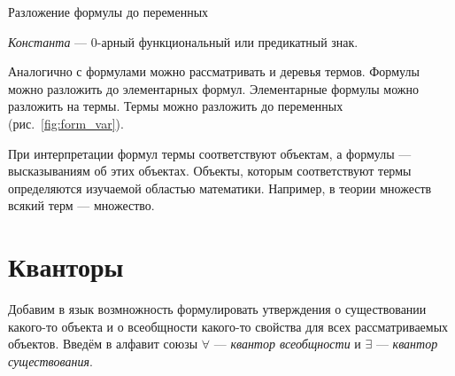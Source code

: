 \newcommand\eps{\varepsilon}
\begin{marginfigure}
  \centering

  \caption{Разложение формулы до переменных}\label{fig:form_var}
\end{marginfigure}

{\it Константа} --- $0$-арный
функциональный или предикатный знак.

Аналогично с формулами можно рассматривать и деревья термов.
Формулы можно разложить до элементарных формул. Элементарные формулы
можно разложить на термы. Термы можно разложить до переменных (рис.~\ref{fig:form_var}).

При интерпретации формул термы соответствуют объектам, а формулы --- высказываниям
об этих объектах. Объекты, которым соответствуют термы определяются изучаемой
областью математики. Например, в теории множеств всякий терм --- множество.

\section{Кванторы}

Добавим в язык возмножность формулировать утверждения о существовании
какого-то объекта и о всеобщности какого-то свойства для всех рассматриваемых объектов.
Введём в алфавит союзы $\forall$
--- {\it квантор всеобщности} и $\exists$
--- {\it квантор существования}.

